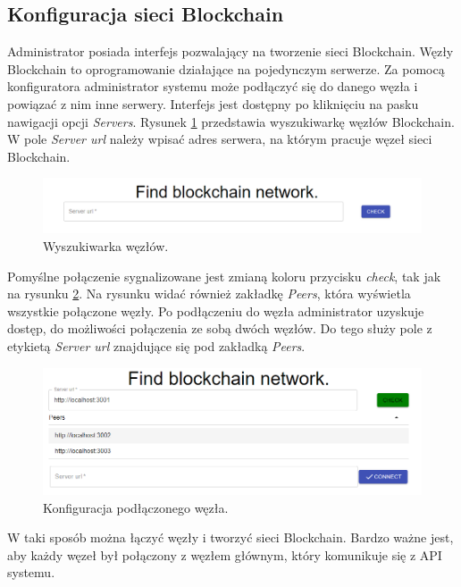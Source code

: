 \documentclass[a4paper,12pt]{book}
\begin{document}
\newpage

\subsection{Konfiguracja sieci Blockchain}

Administrator posiada interfejs pozwalający na tworzenie sieci Blockchain. Węzły Blockchain to oprogramowanie działające na pojedynczym serwerze. Za pomocą konfiguratora administrator systemu może podłączyć się do danego węzła i powiązać z nim inne serwery. Interfejs jest dostępny po kliknięciu na pasku nawigacji opcji \textit{Servers}. Rysunek \ref{findnode} przedstawia wyszukiwarkę węzłów Blockchain. W pole \textit{Server url} należy wpisać adres serwera, na którym pracuje węzeł sieci Blockchain.

\begin{figure}[h]
	\centering
	\includegraphics[width=\textwidth]{images/findnode.png}
	\caption{Wyszukiwarka węzłów.}\label{findnode}
\end {figure}

Pomyślne połączenie sygnalizowane jest zmianą koloru przycisku \textit{check}, tak jak na rysunku \ref{nodeconfig}. Na rysunku widać również zakładkę \textit{Peers}, która wyświetla wszystkie połączone węzły. Po podłączeniu do węzła administrator uzyskuje dostęp, do możliwości połączenia ze sobą dwóch węzłów. Do tego służy pole z etykietą \textit{Server url} znajdujące się pod zakładką \textit{Peers}.

\begin{figure}[h]
	\centering
	\includegraphics[width=\textwidth]{images/ndoeconfig.png}
	\caption{Konfiguracja podłączonego węzła.}\label{nodeconfig}
\end {figure}

W taki sposób można łączyć węzły i tworzyć sieci Blockchain. Bardzo ważne jest, aby każdy węzeł był połączony z węzłem głównym, który komunikuje się z API systemu.
\end{document}
